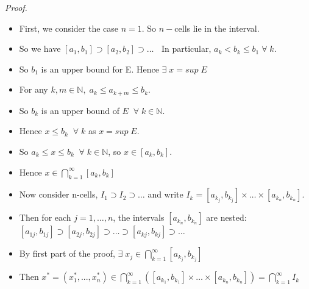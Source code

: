 \documentclass[12pt]{article}
\begin{document}
\vspace{1\baselineskip}
{\sl Proof.}
\begin{itemize}
    \item First, we consider the case $n=1$. So $n-$cells lie in the interval.
    \item So we have $[a_1,b_1]\supset [a_2,b_2]\supset \ldots \;\;$ In particular, $a_k<b_k\le b_1\;\forall \; k$.
    \item So $b_1$ is an upper bound for E. Hence $\exists\; x = sup\; E$
    \item For any $k,m\in\mathbb{N},\; a_k \le a_{k+m} \le b_k$.
    \item So $b_k$ is an upper bound of $E\;\;\forall\;k\in\mathbb{N}$.
    \item Hence $x\le b_k \;\;\forall\;k$ as $x=sup\;E$.
    \item So $a_k \le x \le b_k\;\;\forall\;k\in\mathbb{N}$, so $x\in[a_k,b_k]$.
    \item Hence $x\in \bigcap\limits_{k=1}^\infty [a_k,b_k]$\\
    
    \item Now consider n-cells, $I_1\supset I_2\supset \ldots$ and write $I_k = [a_{k_j},b_{k_j}]\times \ldots\times[a_{k_n},b_{k_n}]$.
    \item Then for each $j=1, \ldots, n$, the intervals $[a_{k_n},b_{k_n}]$ are nested:\\
    $[a_{1j},b_{1j}]\supset [a_{2j},b_{2j}]\supset \ldots \supset [a_{kj},b_{kj}]\supset\ldots$
    \item By first part of the proof, $\exists\;x_j\in\bigcap\limits_{k=1}^\infty [a_{k_j},b_{k_j}]$
    \item Then $x^* = (x_1^*,...,x_n^*) \in \bigcap\limits_{k=1}^\infty ([a_{k_1},b_{k_1}]\times\ldots\times [a_{k_n},b_{k_n}]) = \bigcap\limits_{k=1}^\infty I_k$
\end{itemize}
\end{document}
